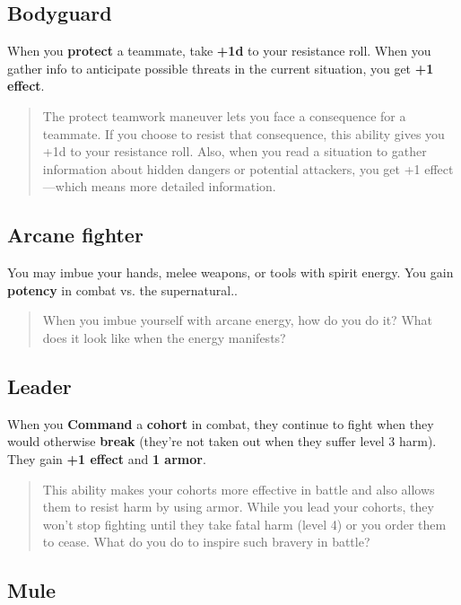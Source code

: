 \documentclass[11pt,fleqn,a5paper]{book}
\newcommand{\gameterm}[1]{\textbf{#1}}
\begin{document}
\subsection{Bodyguard}

When you \textbf{protect} a teammate, take \textbf{+1d} to your resistance roll. When you gather info to anticipate possible threats in the current situation, you get \textbf{+1 effect}.

\begin{quote}
	The protect teamwork maneuver lets you face a consequence for a teammate. If you choose to resist that consequence, this ability gives you +1d to your resistance roll. Also, when you read a situation to gather information about hidden dangers or potential attackers, you get +1 effect---which means more detailed information.
\end{quote}

\subsection{Arcane fighter}

You may imbue your hands, melee weapons, or tools with spirit energy. You gain \textbf{potency} in combat vs. the supernatural..

\begin{quote}
	When you imbue yourself with arcane energy, how do you do it? What does it look like when the energy manifests?
\end{quote} 

\subsection{Leader}

When you \gameterm{Command}  a \textbf{cohort} in combat, they continue to fight when they would otherwise \textbf{break }(they’re not taken out when they suffer level 3 harm). They gain \textbf{+1 effect} and \textbf{1 armor}.

\begin{quote}
	This ability makes your cohorts more effective in battle and also allows them to resist harm by using armor. While you lead your cohorts, they won’t stop fighting until they take fatal harm (level 4) or you order them to cease. What do you do to inspire such bravery in battle?
\end{quote} 

\subsection{Mule}
\end{document}
